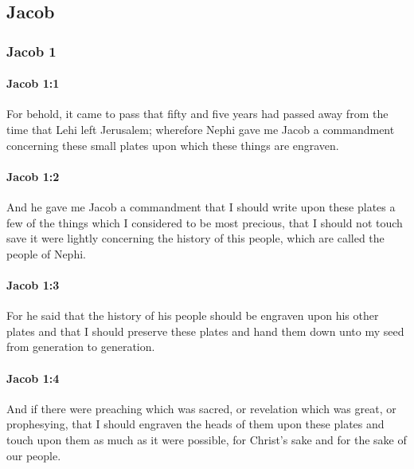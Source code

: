 \subsection{Jacob}
	\label{JACOB}

	\subsubsection{Jacob 1} %
		\label{JACOB-1}
	
		\paragraph{Jacob 1:1} %
			\label{JACOB-1-1}

			For behold, it came to pass that fifty and five years had passed away
			from the time that Lehi left Jerusalem;
			wherefore Nephi gave me Jacob a commandment
			concerning these small plates upon which these things are engraven.

		\paragraph{Jacob 1:2} %
			\label{JACOB-1-2}

			And he gave me Jacob a commandment that I should write upon these plates
			a few of the things which I considered to be most precious,
			that I should not touch save it were lightly
			concerning the history of this people, which are called the people of Nephi.

		\paragraph{Jacob 1:3} %
			\label{JACOB-1-3}

			For he said that the history of his people should be engraven upon his other plates
			and that I should preserve these plates and hand them down
			unto my seed from generation to generation.

		\paragraph{Jacob 1:4} %
			\label{JACOB-1-4}

			And if there were preaching which was sacred,
			or revelation which was great, or prophesying,
			that I should engraven the heads of them upon these plates
			and touch upon them as much as it were possible,
			for Christ's sake and for the sake of our people.

